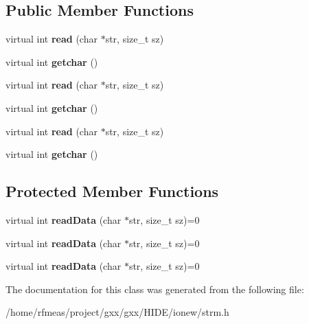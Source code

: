 \subsection*{Public Member Functions}
\begin{DoxyCompactItemize}
\item 
virtual int {\bfseries read} (char $\ast$str, size\+\_\+t sz)\hypertarget{classgxx_1_1io_1_1strmin_a64c5aa687cbf8b1715122c41379ecf2c}{}\label{classgxx_1_1io_1_1strmin_a64c5aa687cbf8b1715122c41379ecf2c}

\item 
virtual int {\bfseries getchar} ()\hypertarget{classgxx_1_1io_1_1strmin_a40b6a0e90d6c0f38c8ca752df61028c2}{}\label{classgxx_1_1io_1_1strmin_a40b6a0e90d6c0f38c8ca752df61028c2}

\item 
virtual int {\bfseries read} (char $\ast$str, size\+\_\+t sz)\hypertarget{classgxx_1_1io_1_1strmin_a64c5aa687cbf8b1715122c41379ecf2c}{}\label{classgxx_1_1io_1_1strmin_a64c5aa687cbf8b1715122c41379ecf2c}

\item 
virtual int {\bfseries getchar} ()\hypertarget{classgxx_1_1io_1_1strmin_a40b6a0e90d6c0f38c8ca752df61028c2}{}\label{classgxx_1_1io_1_1strmin_a40b6a0e90d6c0f38c8ca752df61028c2}

\item 
virtual int {\bfseries read} (char $\ast$str, size\+\_\+t sz)\hypertarget{classgxx_1_1io_1_1strmin_a64c5aa687cbf8b1715122c41379ecf2c}{}\label{classgxx_1_1io_1_1strmin_a64c5aa687cbf8b1715122c41379ecf2c}

\item 
virtual int {\bfseries getchar} ()\hypertarget{classgxx_1_1io_1_1strmin_a40b6a0e90d6c0f38c8ca752df61028c2}{}\label{classgxx_1_1io_1_1strmin_a40b6a0e90d6c0f38c8ca752df61028c2}

\end{DoxyCompactItemize}
\subsection*{Protected Member Functions}
\begin{DoxyCompactItemize}
\item 
virtual int {\bfseries read\+Data} (char $\ast$str, size\+\_\+t sz)=0\hypertarget{classgxx_1_1io_1_1strmin_a84094cdbd544b6213e6127634015cb65}{}\label{classgxx_1_1io_1_1strmin_a84094cdbd544b6213e6127634015cb65}

\item 
virtual int {\bfseries read\+Data} (char $\ast$str, size\+\_\+t sz)=0\hypertarget{classgxx_1_1io_1_1strmin_a84094cdbd544b6213e6127634015cb65}{}\label{classgxx_1_1io_1_1strmin_a84094cdbd544b6213e6127634015cb65}

\item 
virtual int {\bfseries read\+Data} (char $\ast$str, size\+\_\+t sz)=0\hypertarget{classgxx_1_1io_1_1strmin_a84094cdbd544b6213e6127634015cb65}{}\label{classgxx_1_1io_1_1strmin_a84094cdbd544b6213e6127634015cb65}

\end{DoxyCompactItemize}


The documentation for this class was generated from the following file\+:\begin{DoxyCompactItemize}
\item 
/home/rfmeas/project/gxx/gxx/\+H\+I\+D\+E/ionew/strm.\+h\end{DoxyCompactItemize}
